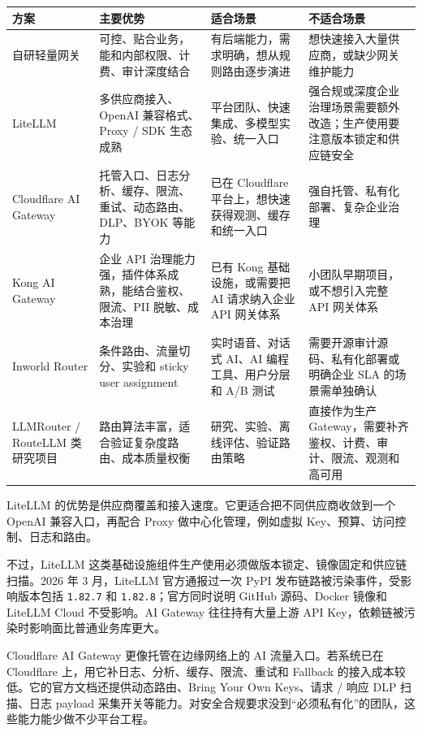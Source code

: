 \documentclass[9pt,a4paper,twocolumn]{ctexart}
\begin{document}
{\footnotesize
\begin{tabular}{|p{}|p{}|p{}|p{}|}
\hline
\textbf{方案} & \textbf{主要优势} & \textbf{适合场景} & \textbf{不适合场景} \\
\hline
自研轻量网关 & 可控、贴合业务，能和内部权限、计费、审计深度结合 & 有后端能力，需求明确，想从规则路由逐步演进 & 想快速接入大量供应商，或缺少网关维护能力 \\
\hline
LiteLLM & 多供应商接入、OpenAI 兼容格式、Proxy / SDK 生态成熟 & 平台团队、快速集成、多模型实验、统一入口 & 强合规或深度企业治理场景需要额外改造；生产使用要注意版本锁定和供应链安全 \\
\hline
Cloudflare AI Gateway & 托管入口、日志分析、缓存、限流、重试、动态路由、DLP、BYOK 等能力 & 已在 Cloudflare 平台上，想快速获得观测、缓存和统一入口 & 强自托管、私有化部署、复杂企业治理 \\
\hline
Kong AI Gateway & 企业 API 治理能力强，插件体系成熟，能结合鉴权、限流、PII 脱敏、成本治理 & 已有 Kong 基础设施，或需要把 AI 请求纳入企业 API 网关体系 & 小团队早期项目，或不想引入完整 API 网关体系 \\
\hline
Inworld Router & 条件路由、流量切分、实验和 sticky user assignment & 实时语音、对话式 AI、AI 编程工具、用户分层和 A/B 测试 & 需要开源审计源码、私有化部署或明确企业 SLA 的场景需单独确认 \\
\hline
LLMRouter / RouteLLM 类研究项目 & 路由算法丰富，适合验证复杂度路由、成本质量权衡 & 研究、实验、离线评估、验证路由策略 & 直接作为生产 Gateway，需要补齐鉴权、计费、审计、限流、观测和高可用 \\
\hline
\end{tabular}
}



LiteLLM 的优势是供应商覆盖和接入速度。它更适合把不同供应商收敛到一个 OpenAI 兼容入口，再配合 Proxy 做中心化管理，例如虚拟 Key、预算、访问控制、日志和路由。



不过，LiteLLM 这类基础设施组件生产使用必须做版本锁定、镜像固定和供应链扫描。2026 年 3 月，LiteLLM 官方通报过一次 PyPI 发布链路被污染事件，受影响版本包括 \texttt{1.82.7} 和 \texttt{1.82.8}；官方同时说明 GitHub 源码、Docker 镜像和 LiteLLM Cloud 不受影响。AI Gateway 往往持有大量上游 API Key，依赖链被污染时影响面比普通业务库更大。



Cloudflare AI Gateway 更像托管在边缘网络上的 AI 流量入口。若系统已在 Cloudflare 上，用它补日志、分析、缓存、限流、重试和 Fallback 的接入成本较低。它的官方文档还提供动态路由、Bring Your Own Keys、请求 / 响应 DLP 扫描、日志 payload 采集开关等能力。对安全合规要求没到“必须私有化”的团队，这些能力能少做不少平台工程。
\end{document}
